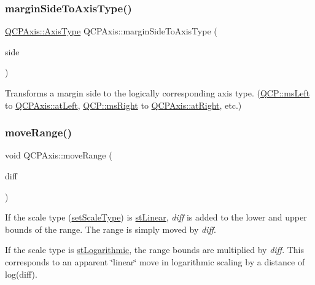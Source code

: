 \subsubsection{\texorpdfstring{margin\+Side\+To\+Axis\+Type()}{marginSideToAxisType()}}
{\footnotesize\ttfamily \mbox{\hyperlink{class_q_c_p_axis_ae2bcc1728b382f10f064612b368bc18a}{Q\+C\+P\+Axis\+::\+Axis\+Type}} Q\+C\+P\+Axis\+::margin\+Side\+To\+Axis\+Type (\begin{DoxyParamCaption}\item[{\mbox{\hyperlink{namespace_q_c_p_a7e487e3e2ccb62ab7771065bab7cae54}{Q\+C\+P\+::\+Margin\+Side}}}]{side }\end{DoxyParamCaption})\hspace{0.3cm}{\ttfamily [static]}}

Transforms a margin side to the logically corresponding axis type. (\mbox{\hyperlink{namespace_q_c_p_a7e487e3e2ccb62ab7771065bab7cae54a9500c8bfcc9e80b9dff0a8e00e867f07}{Q\+C\+P\+::ms\+Left}} to \mbox{\hyperlink{class_q_c_p_axis_ae2bcc1728b382f10f064612b368bc18aaf84aa6cac6fb6099f54a2cbf7546b730}{Q\+C\+P\+Axis\+::at\+Left}}, \mbox{\hyperlink{namespace_q_c_p_a7e487e3e2ccb62ab7771065bab7cae54a93c719593bb2b94ed244d52c86d83b65}{Q\+C\+P\+::ms\+Right}} to \mbox{\hyperlink{class_q_c_p_axis_ae2bcc1728b382f10f064612b368bc18aadf5509f7d29199ef2f263b1dd224b345}{Q\+C\+P\+Axis\+::at\+Right}}, etc.) \mbox{\label{class_q_c_p_axis_a18f3a68f2b691af1fd34b6593c886630}} 
\subsubsection{\texorpdfstring{move\+Range()}{moveRange()}}
{\footnotesize\ttfamily void Q\+C\+P\+Axis\+::move\+Range (\begin{DoxyParamCaption}\item[{double}]{diff }\end{DoxyParamCaption})}

If the scale type (\mbox{\hyperlink{class_q_c_p_axis_adef29cae617af4f519f6c40d1a866ca6}{set\+Scale\+Type}}) is \mbox{\hyperlink{class_q_c_p_axis_a36d8e8658dbaa179bf2aeb973db2d6f0aff6e30a11a828bc850caffab0ff994f6}{st\+Linear}}, {\itshape diff} is added to the lower and upper bounds of the range. The range is simply moved by {\itshape diff}.

If the scale type is \mbox{\hyperlink{class_q_c_p_axis_a36d8e8658dbaa179bf2aeb973db2d6f0abf5b785ad976618816dc6f79b73216d4}{st\+Logarithmic}}, the range bounds are multiplied by {\itshape diff}. This corresponds to an apparent \char`\"{}linear\char`\"{} move in logarithmic scaling by a distance of log(diff). \mbox{\label{class_q_c_p_axis_aa85ba73dfee6483e23825461b725e363}} 
